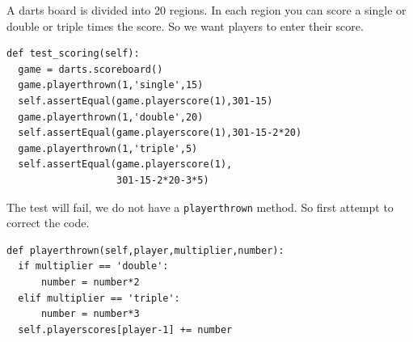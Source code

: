 \documentclass{beamer}
\begin{document}
\begin{frame}[fragile]
A darts board is divided into 20 regions. In each region you can score
a single or double or triple times the score. So we want players to
enter their score.
\begin{lstlisting}
def test_scoring(self):
  game = darts.scoreboard()
  game.playerthrown(1,'single',15)
  self.assertEqual(game.playerscore(1),301-15)
  game.playerthrown(1,'double',20)
  self.assertEqual(game.playerscore(1),301-15-2*20)
  game.playerthrown(1,'triple',5)
  self.assertEqual(game.playerscore(1),
                   301-15-2*20-3*5)
\end{lstlisting}
  
\end{frame}
\begin{frame}[fragile]
The test will fail, we do not have a {\tt playerthrown} method. So
first attempt to correct the code.
\begin{lstlisting}
def playerthrown(self,player,multiplier,number):
  if multiplier == 'double':
      number = number*2
  elif multiplier == 'triple':
      number = number*3
  self.playerscores[player-1] += number
\end{lstlisting}
\end{frame}
\end{document}
